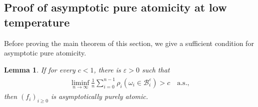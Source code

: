 \documentclass[11pt,reqno]{amsart}
\numberwithin{equation}{section}
\newtheorem{lemma}[thm]{Lemma}
\theoremstyle{definition}
\begin{document}
\subsection{Proof of asymptotic pure atomicity at low temperature} \label{characterize_proof}
Before proving the main theorem of this section, we give a sufficient condition for asymptotic pure atomicity.

\begin{lemma} \label{equiv_apa}
If for every $c < 1$, there is ${\varepsilon} > 0$ such that
{\begin{align} \begin{split} {
\liminf_{n \to \infty} \frac{1}{n} \sum_{i = 0}^{n-1} \rho_i(\omega_i \in {\mathcal{B}}_i^{\varepsilon}) > c \quad \mathrm{a.s.}, \label{equiv_apa_eq}
} \end{split} \end{align}}
then $(f_i)_{i \geq 0}$ is asymptotically purely atomic.
\end{lemma}
\end{document}
